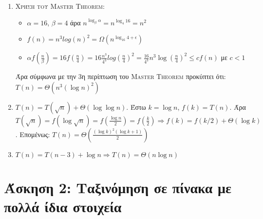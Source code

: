 \documentclass[a4paper,12pt]{report}
\begin{document}
\begin{enumerate}
 \item \textsc{Χρήση του Master Theorem}:
\begin{itemize}
 \item $\alpha=16$, $\beta=4$ άρα $n^{\log_{\beta}{\alpha}}=n^{\log_{4}{16}}=n^2$
 \item $f(n)=n^3 {log(n)}^2=\Omega (n^{\log_{16}{4}+\epsilon})$
 \item $\alpha f(\frac{n}{\beta})=16f(\frac{n}{4})=16\frac{n^3}{4^3}{log(\frac{n}{4})}^2=\frac{16}{4^3}n^3{\log({\frac{n}{4}})}^2 \leq cf(n)$ με $c<1$
\end{itemize}
Άρα σύμφωνα με την 3η περίπτωση του \textsc{Master Theorem} προκύπτει ότι: $T(n)=\Theta(n^3(\log n)^2)$
 \item $T(n)=T(\sqrt{n})+\Theta (\log \log n)$. Έστω $k=\log n$, $f(k)=T(n)$. Άρα $T(\sqrt{n})=f(\log \sqrt{n})=f(\frac{\log n}{2})=f(\frac{k}{2}) \Longrightarrow f(k)=f(k/2)+\Theta(\log k)$. Επομένως: $T(n)=\Theta (\frac{(\log k)^2(\log k +1)}{2})$
 \item $T(n) = T(n-3)+\log n \Longrightarrow T(n)=\Theta (n \log n)$
\end{enumerate}


\section*{Άσκηση 2: Ταξινόμηση σε πίνακα με πολλά ίδια στοιχεία}
\end{document}
